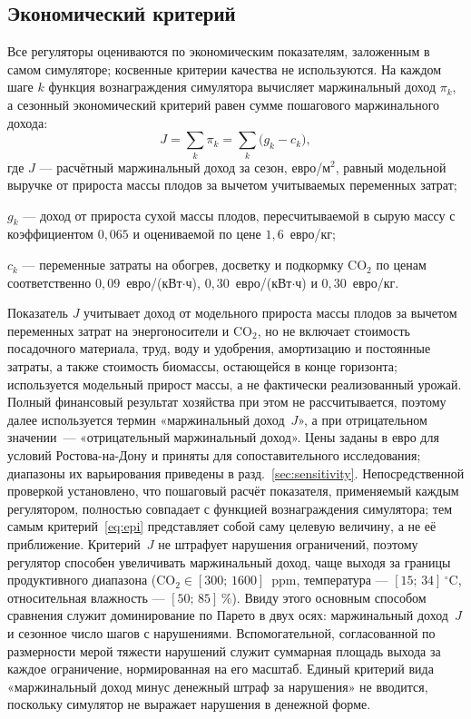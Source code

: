\documentclass[12pt,a4paper,leqno]{article}
\begin{document}
\subsection{Экономический критерий}
Все регуляторы оцениваются по экономическим показателям, заложенным в самом
симуляторе; косвенные критерии качества не используются. На каждом шаге $k$ функция
вознаграждения симулятора вычисляет маржинальный доход $\pi_k$, а сезонный экономический критерий
равен сумме пошагового маржинального дохода:
\begin{equation}
J=\sum_{k} \pi_k=\sum_{k}\bigl(g_k-c_k\bigr),
\label{eq:epi}
\end{equation}
где $J$ — расчётный маржинальный доход за сезон, евро/м$^2$, равный модельной выручке от
прироста массы плодов за вычетом учитываемых переменных затрат;\par
\noindent $g_k$ — доход от прироста сухой массы плодов, пересчитываемой в сырую массу с
коэффициентом $0{,}065$ и оцениваемой по цене $1{,}6$~евро/кг;\par
\noindent $c_k$ — переменные затраты на обогрев, досветку и подкормку CO$_2$ по ценам
соответственно $0{,}09$~евро/(кВт$\cdot$ч), $0{,}30$~евро/(кВт$\cdot$ч) и
$0{,}30$~евро/кг.\par
Показатель $J$ учитывает доход от модельного прироста массы плодов за вычетом переменных
затрат на энергоносители и CO$_2$, но не включает стоимость посадочного материала, труд,
воду и удобрения, амортизацию и постоянные затраты, а также стоимость биомассы,
остающейся в конце горизонта; используется модельный прирост массы, а не фактически
реализованный урожай. Полный финансовый результат хозяйства при этом не рассчитывается,
поэтому далее используется термин «маржинальный доход~$J$», а при отрицательном
значении~--- «отрицательный маржинальный доход». Цены заданы в евро для условий
Ростова-на-Дону и приняты для сопоставительного исследования; диапазоны их варьирования
приведены в разд.~\ref{sec:sensitivity}. Непосредственной проверкой установлено, что
пошаговый расчёт показателя, применяемый каждым регулятором, полностью совпадает с
функцией вознаграждения симулятора; тем самым критерий~\eqref{eq:epi} представляет собой
саму целевую величину, а не её приближение.
Критерий~$J$ не штрафует нарушения ограничений, поэтому регулятор способен увеличивать
маржинальный доход, чаще выходя за границы продуктивного диапазона (CO$_2\in[300;\,1600]$~ppm,
температура — $[15;\,34]\,^\circ$C, относительная влажность — $[50;\,85]\,\%$). Ввиду
этого основным способом сравнения служит доминирование по Парето в двух осях:
маржинальный доход~$J$ и сезонное число шагов с нарушениями. Вспомогательной, согласованной по
размерности мерой тяжести нарушений служит суммарная площадь выхода за каждое
ограничение, нормированная на его масштаб. Единый критерий вида «маржинальный доход минус денежный
штраф за нарушения» не вводится, поскольку симулятор не выражает нарушения в денежной
форме.
\end{document}
